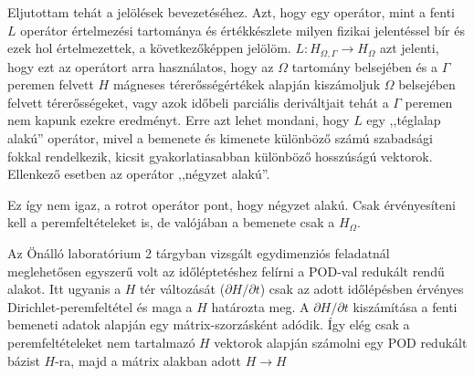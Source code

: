 Eljutottam tehát a jelölések bevezetéséhez. Azt, hogy egy operátor, mint a fenti $L$ operátor értelmezési tartománya és értékkészlete milyen fizikai jelentéssel bír és ezek hol értelmezettek, a következőképpen jelölöm. $L: H_{\Omega, \Gamma} \rightarrow H_{\Omega}$ azt jelenti, hogy ezt az operátort arra használatos, hogy az $\Omega$ tartomány belsejében és a $\Gamma$ peremen felvett $H$ mágneses térerősségértékek alapján kiszámoljuk $\Omega$ belsejében felvett térerősségeket, vagy azok időbeli parciális deriváltjait tehát a $\Gamma$ peremen nem kapunk ezekre eredményt. Erre azt lehet mondani, hogy $L$ egy ,,téglalap alakú'' operátor, mivel a bemenete és kimenete különböző számú szabadsági fokkal rendelkezik, kicsit gyakorlatiasabban különböző hosszúságú vektorok. Ellenkező esetben az operátor ,,négyzet alakú''.

Ez így nem igaz, a rotrot operátor pont, hogy négyzet alakú. Csak érvényesíteni kell a peremfeltételeket is, de valójában a bemenete csak a $H_{\Omega}$.

Az Önálló laboratórium 2 tárgyban vizsgált egydimenziós feladatnál meglehetősen egyszerű volt az időléptetéshez felírni a POD-val redukált rendű alakot. Itt ugyanis a $H$ tér változását ($\partial H/\partial t$) csak az adott időlépésben érvényes Dirichlet-peremfeltétel és maga a $H$ határozta meg. A $\partial H/\partial t$ kiszámítása a fenti bemeneti adatok alapján egy mátrix-szorzásként adódik. Így elég csak a peremfeltételeket nem tartalmazó $H$ vektorok alapján számolni egy POD redukált bázist $H$-ra, majd a mátrix alakban adott $H \rightarrow H$